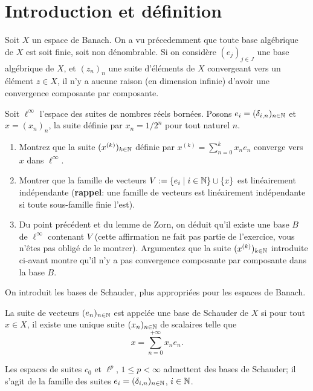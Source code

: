 \section{Introduction et définition}
Soit $X$ un espace de Banach. On a vu précedemment que toute base algébrique
de $X$ est soit finie, soit non dénombrable.
Si on considère $(e_j)_{j\in J}$ une base algébrique de $X$, et $(z_n)_n$ une
suite d'éléments de $X$ convergeant vers un élément $z\in X$, il n'y a aucune
raison (en dimension infinie) d'avoir une convergence composante par composante.
\begin{exo}
  Soit $\ell^\infty$ l'espace des suites de nombres réels bornées.
  Posons $e_i=(\delta_{i, n})_{n\in\mathbb{N}}$
  et $x=(x_n)_n$, la suite définie par $x_n = 1/2^n$ pour tout naturel $n$.
  \begin{enumerate}
  \item Montrez que la suite $(x^{(k)})_{k\in\mathbb{N}}$ définie par
    $x^{(k)}=\sum_{n=0}^kx_ne_n$ converge vers $x$ dans $\ell^\infty$.
  \item Montrer que la famille de vecteurs $V:= \{e_i \mid i\in \mathbb{N}\}\cup \{x\}$
    est linéairement indépendante (\textbf{rappel}: une famille de vecteurs est
    linéairement indépendante si toute sous-famille finie l'est).
  \item Du point précédent et du lemme de Zorn, on déduit qu'il existe une
    base $B$ de $\ell^\infty$ contenant $V$ (cette affirmation ne fait pas
    partie de l'exercice, vous n'êtes pas obligé de le montrer).
    Argumentez que la suite $(x^{(k)})_{k\in\mathbb{N}}$ introduite ci-avant
    montre qu'il n'y a pas convergence composante par composante
    dans la base $B$.
  \end{enumerate}
\end{exo}

On introduit les bases de Schauder, plus appropriées pour les espaces de Banach.
\begin{df}
  La suite de vecteurs $(e_n)_{n\in\mathbb{N}}$ est appelée une base de Schauder de $X$
  si pour tout $x\in X$, il existe une unique suite $(x_n)_{n\in\mathbb{N}}$ de
  scalaires telle que
  $$x = \sum_{n=0}^{+\infty}x_ne_n.$$
\end{df}

\begin{ex}
  Les espaces de suites $c_0$ et $\ell^p$, $1\leq p < \infty$ admettent
  des bases de Schauder; il s'agit de la famille des suites
  $e_i=(\delta_{i, n})_{n\in\mathbb{N}}$, $i\in\mathbb{N}$.
\end{ex}

